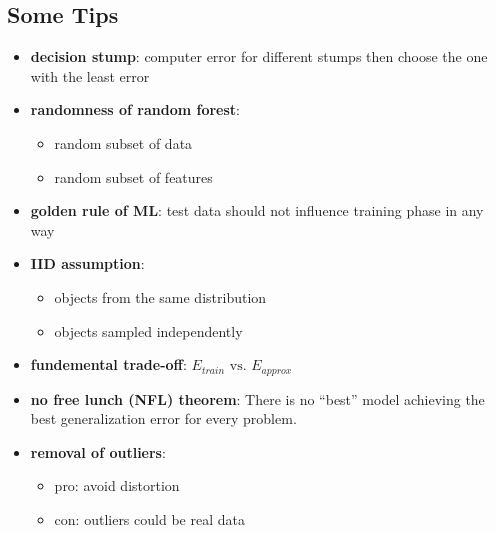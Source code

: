 \documentclass[10pt,landscape,a4paper]{article}
\begin{document}
\begin{multicols*}{5}
\section{Some Tips}
\begin{itemize}
    \item \textbf{decision stump}: computer error for different stumps then choose the one with the least error
    \item \textbf{randomness of random forest}:
    \begin{itemize}
        \item random subset of data
        \item random subset of features
    \end{itemize}
    \item \textbf{golden rule of ML}: test data should not influence training phase in any way
    \item \textbf{IID assumption}:
    \begin{itemize}
        \item objects from the same distribution
        \item objects sampled independently
    \end{itemize}
    \item \textbf{fundemental trade-off}: \(E_{train} \text{ vs. } E_{approx}\)
    \item \textbf{no free lunch (NFL) theorem}: There is no ``best'' model achieving the best generalization error for every problem.
    \item \textbf{removal of outliers}:
    \begin{itemize}
        \item pro: avoid distortion
        \item con: outliers could be real data
    \end{itemize}
\end{itemize}

\end{multicols*}
\end{document}
